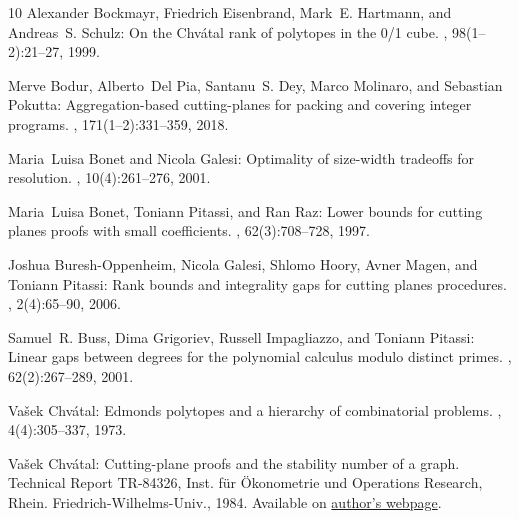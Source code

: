 \begin{thebibliography}{10}
{\sc Alexander Bockmayr, Friedrich Eisenbrand, Mark~E. Hartmann, and Andreas~S.
  Schulz}: On the {C}hv{\'{a}}tal rank of polytopes in the 0/1 cube.
, 98(1--2):21--27, 1999.
\newblock [\epfmtdoi{10.1016/S0166-218X(99)00156-0}]

{\sc Merve Bodur, Alberto~Del Pia, Santanu~S. Dey, Marco Molinaro, and
  Sebastian Pokutta}: Aggregation-based cutting-planes for packing and covering
  integer programs.
, 171(1--2):331--359, 2018.
\newblock [\epfmtdoi{10.1007/s10107-017-1192-x}]

{\sc Maria~Luisa Bonet and Nicola Galesi}: Optimality of size-width tradeoffs
  for resolution.
, 10(4):261--276, 2001.
\newblock [\epfmtdoi{10.1007/s000370100000}]

{\sc Maria~Luisa Bonet, Toniann Pitassi, and Ran Raz}: Lower bounds for cutting
  planes proofs with small coefficients.
, 62(3):708--728, 1997.
\newblock [\epfmtdoi{10.2307/2275569}]

{\sc Joshua Buresh{-}Oppenheim, Nicola Galesi, Shlomo Hoory, Avner Magen, and
  Toniann Pitassi}: Rank bounds and integrality gaps for cutting planes
  procedures.
, 2(4):65--90, 2006.

{\sc Samuel~R. Buss, Dima Grigoriev, Russell Impagliazzo, and Toniann Pitassi}:
  Linear gaps between degrees for the polynomial calculus modulo distinct
  primes.
, 62(2):267--289, 2001.

{\sc Va{\v{s}}ek Chv{\'{a}}tal}: Edmonds polytopes and a hierarchy of
  combinatorial problems.
, 4(4):305--337, 1973.
\newblock [\epfmtdoi{10.1016/0012-365X(73)90167-2}]

{\sc Va{\v{s}}ek Chv{\'a}tal}: Cutting-plane proofs and the stability number of
  a graph.
\newblock Technical Report TR-84326, Inst. f{\"u}r {\"O}konometrie und
  Operations Research, Rhein. Friedrich-Wilhelms-Univ., 1984.
\newblock Available on
  \href{https://users.encs.concordia.ca/~chvatal/Bonn84.pdf}{author's webpage}.


\end{thebibliography}

